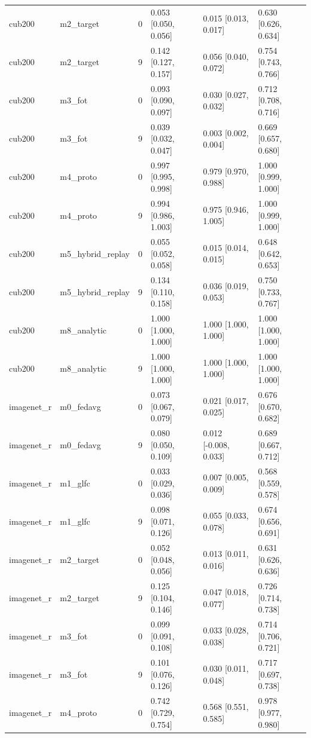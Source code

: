 \begin{tabular}{llrlll}
cub200 & m2\_target & 0 & 0.053 [0.050, 0.056] & 0.015 [0.013, 0.017] & 0.630 [0.626, 0.634] \\
cub200 & m2\_target & 9 & 0.142 [0.127, 0.157] & 0.056 [0.040, 0.072] & 0.754 [0.743, 0.766] \\
cub200 & m3\_fot & 0 & 0.093 [0.090, 0.097] & 0.030 [0.027, 0.032] & 0.712 [0.708, 0.716] \\
cub200 & m3\_fot & 9 & 0.039 [0.032, 0.047] & 0.003 [0.002, 0.004] & 0.669 [0.657, 0.680] \\
cub200 & m4\_proto & 0 & 0.997 [0.995, 0.998] & 0.979 [0.970, 0.988] & 1.000 [0.999, 1.000] \\
cub200 & m4\_proto & 9 & 0.994 [0.986, 1.003] & 0.975 [0.946, 1.005] & 1.000 [0.999, 1.000] \\
cub200 & m5\_hybrid\_replay & 0 & 0.055 [0.052, 0.058] & 0.015 [0.014, 0.015] & 0.648 [0.642, 0.653] \\
cub200 & m5\_hybrid\_replay & 9 & 0.134 [0.110, 0.158] & 0.036 [0.019, 0.053] & 0.750 [0.733, 0.767] \\
cub200 & m8\_analytic & 0 & 1.000 [1.000, 1.000] & 1.000 [1.000, 1.000] & 1.000 [1.000, 1.000] \\
cub200 & m8\_analytic & 9 & 1.000 [1.000, 1.000] & 1.000 [1.000, 1.000] & 1.000 [1.000, 1.000] \\
imagenet\_r & m0\_fedavg & 0 & 0.073 [0.067, 0.079] & 0.021 [0.017, 0.025] & 0.676 [0.670, 0.682] \\
imagenet\_r & m0\_fedavg & 9 & 0.080 [0.050, 0.109] & 0.012 [-0.008, 0.033] & 0.689 [0.667, 0.712] \\
imagenet\_r & m1\_glfc & 0 & 0.033 [0.029, 0.036] & 0.007 [0.005, 0.009] & 0.568 [0.559, 0.578] \\
imagenet\_r & m1\_glfc & 9 & 0.098 [0.071, 0.126] & 0.055 [0.033, 0.078] & 0.674 [0.656, 0.691] \\
imagenet\_r & m2\_target & 0 & 0.052 [0.048, 0.056] & 0.013 [0.011, 0.016] & 0.631 [0.626, 0.636] \\
imagenet\_r & m2\_target & 9 & 0.125 [0.104, 0.146] & 0.047 [0.018, 0.077] & 0.726 [0.714, 0.738] \\
imagenet\_r & m3\_fot & 0 & 0.099 [0.091, 0.108] & 0.033 [0.028, 0.038] & 0.714 [0.706, 0.721] \\
imagenet\_r & m3\_fot & 9 & 0.101 [0.076, 0.126] & 0.030 [0.011, 0.048] & 0.717 [0.697, 0.738] \\
imagenet\_r & m4\_proto & 0 & 0.742 [0.729, 0.754] & 0.568 [0.551, 0.585] & 0.978 [0.977, 0.980] \\

\end{tabular}
